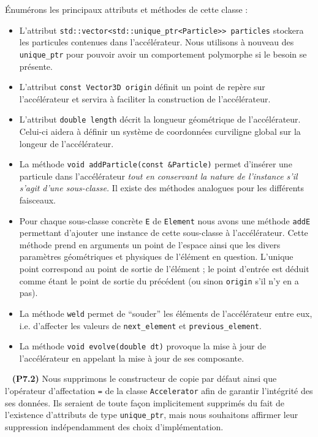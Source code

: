 \documentclass[12pt, letterpaper, twoside]{article}
\newcommand{\T}[1]{\texttt{#1}}
\begin{document}
Énumérons les principaux attributs et méthodes de cette classe :
\begin{itemize}
	\item L'attribut \T{std::vector<std::unique\_ptr<Particle>> particles} stockera les particules contenues dans l'accélérateur. Nous utilisons à nouveau des \T{unique\_ptr} pour pouvoir avoir un comportement polymorphe si le besoin se présente.
	\item L'attribut \T{const Vector3D origin} définit un point de repère sur l'accélérateur et servira à faciliter la construction de l'accélérateur.
	\item L'attribut \T{double length} décrit la longueur géométrique de l'accélérateur. Celui-ci aidera à définir un système de coordonnées curviligne global sur la longeur de l'accélérateur.
	\item La méthode \T{void addParticle(const \&Particle)} permet d'insérer une particule dans l'accélérateur \textit{tout en conservant la nature de l'instance s'il s'agit d'une sous-classe.} Il existe des méthodes analogues pour les différents faisceaux.
	\item Pour chaque sous-classe concrète \T{E} de \T{Element} nous avons une méthode \T{addE} permettant d'ajouter une instance de cette sous-classe à l'accélérateur. Cette méthode prend en arguments un point de l'espace ainsi que les divers paramètres géométriques et physiques de l'élément en question. L'unique point correspond au point de sortie de l'élément ; le point d'entrée est déduit comme étant le point de sortie du précédent (ou sinon \T{origin} s'il n'y en a pas).
	\item La méthode \T{weld} permet de ``souder'' les éléments de l'accélérateur entre eux, i.e. d'affecter les valeurs de \T{next\_element} et \T{previous\_element}.

	\item La méthode \T{void evolve(double dt)} provoque la mise à jour de l'accélérateur en appelant la mise à jour de ses composante.
\end{itemize}

\ \linebreak
\noindent \textbf{(P7.2)} Nous supprimons le constructeur de copie par défaut ainsi que l'opérateur d'affectation \T{=} de la classe \T{Accelerator} afin de garantir l'intégrité des ses données. Ils seraient de toute façon implicitement supprimés du fait de l'existence d'attributs de type \T{unique\_ptr}, mais nous souhaitons affirmer leur suppression indépendamment des choix d'implémentation.
\end{document}
